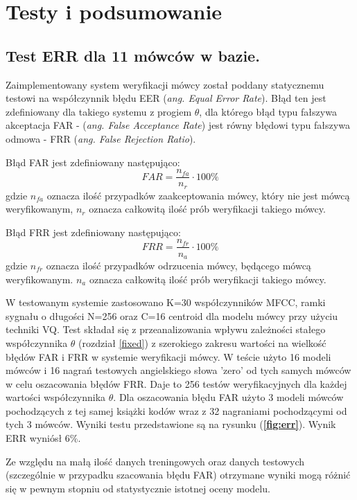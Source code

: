 \chapter{Testy i podsumowanie}

\section{Test ERR dla 11 mówców w bazie.}

Zaimplementowany system weryfikacji mówcy został poddany statycznemu testowi na współczynnik błędu EER (\textit{ang. Equal Error Rate}). Błąd ten jest zdefiniowany dla takiego systemu z progiem $\theta$, dla którego błąd typu fałszywa akceptacja FAR - (\textit{ang. False Acceptance Rate}) jest równy błędowi typu fałszywa odmowa - FRR (\textit{ang. False Rejection Ratio}).

\label{err}

Błąd FAR jest zdefiniowany następująco:
  \begin{equation}
  FAR = \frac{n_{fa}}{n_r} \cdot 100\%
  \end{equation}
  gdzie $n_{fa}$ oznacza ilość przypadków zaakceptowania mówcy, który nie jest mówcą weryfikowanym, $n_{r}$ oznacza całkowitą ilość prób weryfikacji takiego mówcy.

Błąd FRR jest zdefiniowany następująco:
  \begin{equation}
  FRR = \frac{n_{fr}}{n_a} \cdot 100\%
  \end{equation}
  gdzie $n_{fr}$ oznacza ilość przypadków odrzucenia mówcy, będącego mówcą weryfikowanym. $n_{a}$ oznacza całkowitą ilość prób weryfikacji takiego mówcy.


W testowanym systemie zastosowano K=30 współczynników MFCC, ramki sygnału o długości N=256 oraz C=16 centroid dla modelu mówcy przy użyciu techniki VQ. Test składał się z przeanalizowania wpływu zależności stałego współczynnika $\theta$ (rozdział {\ref{fixed}}) z szerokiego zakresu wartości na wielkość błędów FAR i FRR w systemie weryfikacji mówcy. W teście użyto 16 modeli mówców i 16 nagrań testowych angielskiego słowa 'zero' od tych samych mówców w celu oszacowania błędów FRR. Daje to 256 testów weryfikacyjnych dla każdej wartości współczynnika $\theta$. Dla oszacowania błędu FAR użyto 3 modeli mówców pochodzących z tej samej książki kodów wraz z 32 nagraniami pochodzącymi od tych 3 mówców. Wyniki testu przedstawione są na rysunku (\textbf{\ref{fig:err}}). Wynik ERR wyniósł 6\%.

Ze względu na małą ilość danych treningowych oraz danych testowych (szczególnie w przypadku szacowania błędu FAR) otrzymane wyniki mogą różnić się w pewnym stopniu od statystycznie istotnej oceny modelu.


